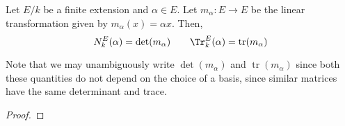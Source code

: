 \begin{theorem}
    Let $E/k$ be a finite extension and $\alpha\in E$. Let $m_\alpha: E\to E$ be the linear transformation given by $m_\alpha(x) = \alpha x$. Then, 
    \begin{equation*}
        N^E_k(\alpha) = \det(m_\alpha)\qquad \Tr^E_k(\alpha) = \operatorname{tr}(m_\alpha)
    \end{equation*}
\end{theorem}
Note that we may unambiguously write $\det(m_\alpha)$ and $\operatorname{tr}(m_\alpha)$ since both these quantities do not depend on the choice of a basis, since similar matrices have the same determinant and trace.
\begin{proof}

\end{proof}